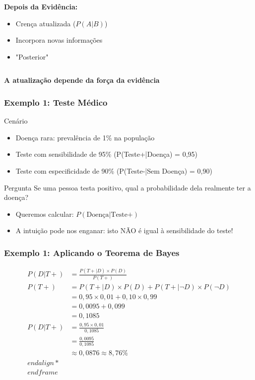 \documentclass[11pt]{beamer}
\begin{document}
\begin{frame}
\begin{frame}
\begin{columns}
\begin{column}{0.48\textwidth}
\textbf{Depois da Evidência:}
\begin{itemize}
\item Crença atualizada ($P(A|B)$)
\item Incorpora novas informações
\item "Posterior"
\end{itemize}
\end{column}
\end{columns}

\vspace{0.5cm}
\begin{center}
\textbf{A atualização depende da força da evidência}
\end{center}
\end{frame}

\begin{frame}
\frametitle{Exemplo 1: Teste Médico}
\begin{block}{Cenário}
\begin{itemize}
\item Doença rara: prevalência de 1\% na população
\item Teste com sensibilidade de 95\% (P(Teste+|Doença) = 0,95)
\item Teste com especificidade de 90\% (P(Teste-|Sem Doença) = 0,90)
\end{itemize}
\end{block}

\begin{alertblock}{Pergunta}
Se uma pessoa testa positivo, qual a probabilidade dela realmente ter a doença?
\end{alertblock}

\begin{itemize}
\item Queremos calcular: $P(\text{Doença}|\text{Teste+})$
\item A intuição pode nos enganar: isto NÃO é igual à sensibilidade do teste!
\end{itemize}
\end{frame}

\begin{frame}
\frametitle{Exemplo 1: Aplicando o Teorema de Bayes}
\begin{align*}
P(D|T+) &= \frac{P(T+|D) \times P(D)}{P(T+)} \\[10pt]
P(T+) &= P(T+|D) \times P(D) + P(T+|\neg D) \times P(\neg D) \\
&= 0,95 \times 0,01 + 0,10 \times 0,99 \\
&= 0,0095 + 0,099 \\
&= 0,1085 \\[10pt]
P(D|T+) &= \frac{0,95 \times 0,01}{0,1085} \\
&= \frac{0,0095}{0,1085} \\
&\approx 0,0876 \approx 8,76\%
\\end{align*}
\\end{frame}


\end{align*}
\end{frame}
\end{frame}
\end{document}
